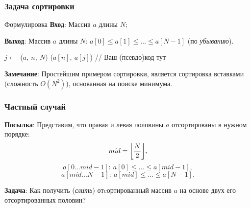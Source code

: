 \documentclass{beamer}
\DeclarePairedDelimiter\floor{\lfloor}{\rfloor}
\begin{document}
    \begin{frame}[fragile]
        \frametitle{Задача сортировки}
        \begin{block}{Формулировка}
            \justifying
            {\bf Вход}: Массив $a$ длины $N$;
            \par
            {\bf Выход}: Массив $a$ длины $N$: $a[0] \leq a[1] \leq \dotsc \leq a[N - 1]$ (по {\it убыванию}).
        \end{block}
        \par
        \begin{algorithm}[H]
            \DontPrintSemicolon

            {
                {
                    $j \leftarrow$ \FMinIndex($a,\ n,\ N$)\;
                    \FSwap($a[n],\ a[j]$)\;
                }
            }
            \;
            {
                // Ваш (псевдо)код тут
            }
            \;
        \end{algorithm}
        \justifying
        \par
        {\bf Замечание}: Простейшим примером сортировки, является сортировка вставками (сложность $O(N^{2})$), основанная на поиске минимума.
    \end{frame}
    \begin{frame}
        \frametitle{Частный случай}
        \justifying
        {\bf Посылка}: Представим, что правая и левая половины $a$ отсортированы в нужном порядке:
        $$mid = \floor*{\frac{N}{2}},$$
        $$a[0\dotsc  mid - 1]:\ a[0] \leq \dotsc \leq a[mid - 1],$$
        $$a[mid \dotsc N - 1]:\ a[mid] \leq \dotsc \leq a[N - 1].$$
        \par
        \vspace{0.2cm}
        \justifying
        {\bf Задача}: Как получить ({\it слить}) отcортированный массив $a$ на основе двух его отсортированных половин?
    \end{frame}
\end{document}
